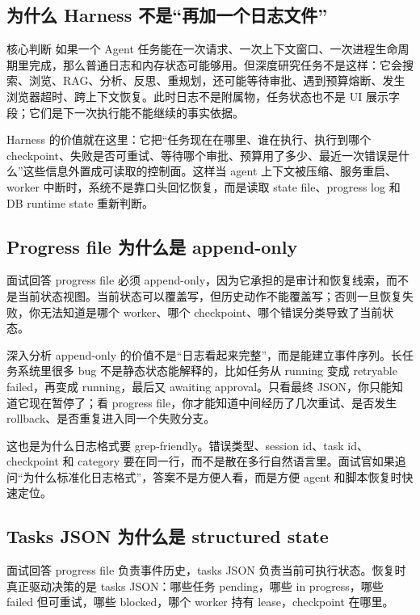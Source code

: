 \subsection{为什么 Harness 不是“再加一个日志文件”}
\begin{analysisBox}{核心判断}
如果一个 Agent 任务能在一次请求、一次上下文窗口、一次进程生命周期里完成，那么普通日志和内存状态可能够用。但深度研究任务不是这样：它会搜索、浏览、RAG、分析、反思、重规划，还可能等待审批、遇到预算熔断、发生浏览器超时、跨上下文恢复。此时日志不是附属物，任务状态也不是 UI 展示字段；它们是下一次执行能不能继续的事实依据。

Harness 的价值就在这里：它把“任务现在在哪里、谁在执行、执行到哪个 checkpoint、失败是否可重试、等待哪个审批、预算用了多少、最近一次错误是什么”这些信息外置成可读取的控制面。这样当 agent 上下文被压缩、服务重启、worker 中断时，系统不是靠口头回忆恢复，而是读取 state file、progress log 和 DB runtime state 重新判断。
\end{analysisBox}

\subsection{Progress file 为什么是 append-only}
\begin{qaBox}{面试回答}
progress file 必须 append-only，因为它承担的是审计和恢复线索，而不是当前状态视图。当前状态可以覆盖写，但历史动作不能覆盖写；否则一旦恢复失败，你无法知道是哪个 worker、哪个 checkpoint、哪个错误分类导致了当前状态。
\end{qaBox}

\begin{analysisBox}{深入分析}
append-only 的价值不是“日志看起来完整”，而是能建立事件序列。长任务系统里很多 bug 不是静态状态能解释的，比如任务从 running 变成 retryable failed，再变成 running，最后又 awaiting approval。只看最终 JSON，你只能知道它现在暂停了；看 progress file，你才能知道中间经历了几次重试、是否发生 rollback、是否重复进入同一个失败分支。

这也是为什么日志格式要 grep-friendly。错误类型、session id、task id、checkpoint 和 category 要在同一行，而不是散在多行自然语言里。面试官如果追问“为什么标准化日志格式”，答案不是方便人看，而是方便 agent 和脚本恢复时快速定位。
\end{analysisBox}

\subsection{Tasks JSON 为什么是 structured state}
\begin{qaBox}{面试回答}
progress file 负责事件历史，tasks JSON 负责当前可执行状态。恢复时真正驱动决策的是 tasks JSON：哪些任务 pending，哪些 in progress，哪些 failed 但可重试，哪些 blocked，哪个 worker 持有 lease，checkpoint 在哪里。
\end{qaBox}

